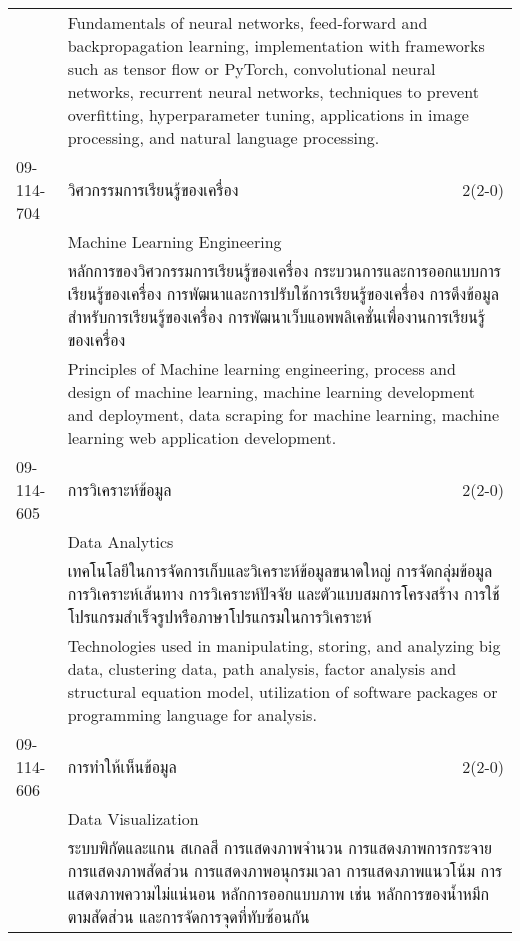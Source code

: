 \begin{longtable}{p{}p{}r{}}
&  \multicolumn{2}{p{0.75\textwidth}}{Fundamentals of neural networks, feed-forward and backpropagation learning, implementation with frameworks such as tensor flow or PyTorch, convolutional neural networks, recurrent neural networks, techniques to prevent overfitting, hyperparameter tuning, applications in image processing, and natural language processing.} \vspace{8mm} \\*
09-114-704 & วิศวกรรมการเรียนรู้ของเครื่อง & 2(2-0)\\*
 & Machine Learning Engineering & \phantom{x} \vspace{3mm} \\*
&  \multicolumn{2}{p{0.75\textwidth}}{หลักการของวิศวกรรมการเรียนรู้ของเครื่อง กระบวนการและการออกแบบการเรียนรู้ของเครื่อง การพัฒนาและการปรับใช้การเรียนรู้ของเครื่อง การดึงข้อมูลสำหรับการเรียนรู้ของเครื่อง การพัฒนาเว็บแอพพลิเคชั่นเพื่องานการเรียนรู้ของเครื่อง } \vspace{3mm} \\*
&  \multicolumn{2}{p{0.75\textwidth}}{Principles of Machine learning engineering, process and design of machine learning, machine learning development and deployment, data scraping for machine learning, machine learning web application development.} \vspace{8mm} \\*
09-114-605 & การวิเคราะห์ข้อมูล & 2(2-0)\\*
 & Data Analytics & \phantom{x} \vspace{3mm} \\*
&  \multicolumn{2}{p{0.75\textwidth}}{เทคโนโลยีในการจัดการเก็บและวิเคราะห์ข้อมูลขนาดใหญ่ การจัดกลุ่มข้อมูล การวิเคราะห์เส้นทาง การวิเคราะห์ปัจจัย และตัวแบบสมการโครงสร้าง การใช้โปรแกรมสำเร็จรูปหรือภาษาโปรแกรมในการวิเคราะห์} \vspace{3mm} \\*
&  \multicolumn{2}{p{0.75\textwidth}}{Technologies used in manipulating, storing, and analyzing big data, clustering data, path analysis, factor analysis and structural equation model, utilization of software packages or programming language for analysis.} \vspace{8mm} \\*
09-114-606 & การทำให้เห็นข้อมูล & 2(2-0)\\*
 & Data Visualization & \phantom{x} \vspace{3mm} \\*
&  \multicolumn{2}{p{0.75\textwidth}}{ระบบพิกัดและแกน สเกลสี การแสดงภาพจำนวน การแสดงภาพการกระจาย การแสดงภาพสัดส่วน การแสดงภาพอนุกรมเวลา การแสดงภาพแนวโน้ม การแสดงภาพความไม่แน่นอน หลักการออกแบบภาพ เช่น หลักการของน้ำหมึกตามสัดส่วน และการจัดการจุดที่ทับซ้อนกัน} \vspace{3mm} \\*

\end{longtable}
